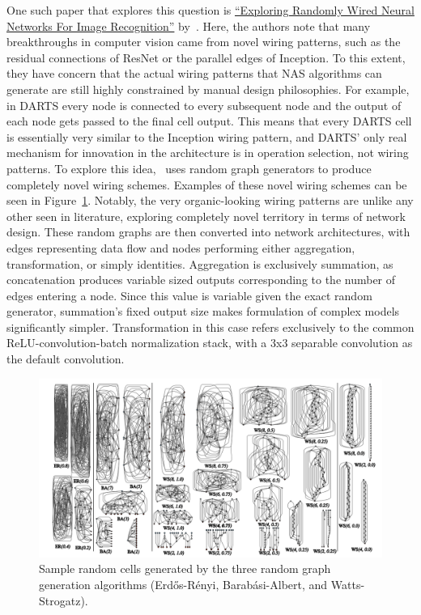 One such paper that explores this question is \hyperlink{cite.xi2019}{``Exploring Randomly Wired Neural Networks For Image Recognition''}
by~\cite{xi2019}. Here, the authors note that many breakthroughs in computer vision came from novel wiring patterns,
such as the residual connections of ResNet or the parallel edges of Inception. To this extent, they have concern that the
actual wiring patterns that NAS algorithms can generate are still highly constrained by manual design philosophies. For
example, in DARTS every node is connected to every subsequent node and the output of each node gets passed to the final
cell output. This means that every DARTS cell is essentially very similar to the Inception wiring pattern, and DARTS'
only real mechanism for innovation in the architecture is in operation selection, not wiring patterns. To explore this
idea,~\citeauthor{xi2019} uses random graph generators to produce completely novel wiring schemes. Examples of these novel
wiring schemes can be seen in Figure~\ref{fig:random_wiring}. Notably, the very organic-looking wiring patterns are
unlike any other seen in literature, exploring completely novel territory in terms of network design. These random graphs
are then converted into network architectures, with edges representing data flow and nodes performing either aggregation,
transformation, or simply identities. Aggregation is exclusively summation, as concatenation produces variable sized
outputs corresponding to the number of edges entering a node. Since this value is variable given the exact random
generator, summation's fixed output size makes formulation of complex models significantly simpler. Transformation in
this case refers exclusively to the common ReLU-convolution-batch normalization stack, with a 3x3 separable convolution
as the default convolution.

\begin{figure}
    \center
    \includegraphics[width=\textwidth]{random_wiring}
    \caption[Sample random cells generated by three random graph generation algorithms]{Sample random cells generated by the three random graph generation algorithms (Erd\H{o}s-R\'enyi,
        Barab\'asi-Albert, and Watts-Strogatz).}
    \label{fig:random_wiring}
\end{figure}

